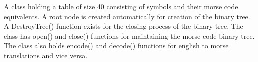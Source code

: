 A class holding a table of size 40 consisting of symbols and their morse code equivalents. A root node is created automatically for creation of the binary tree. A Destroy\+Tree() function exists for the closing process of the binary tree. The class has open() and close() functions for maintaining the morse code binary tree. The class also holds encode() and decode() functions for english to morse translations and vice versa. 